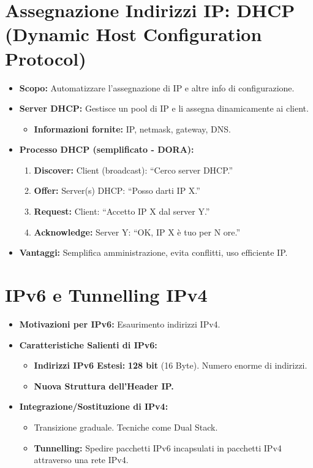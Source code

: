 \documentclass{article}
\begin{document}
\section{Assegnazione Indirizzi IP: DHCP (Dynamic Host Configuration Protocol)}
\begin{itemize}
    \item \textbf{Scopo:} Automatizzare l'assegnazione di IP e altre info di configurazione.
    \item \textbf{Server DHCP:} Gestisce un pool di IP e li assegna dinamicamente ai client.
    \begin{itemize}
        \item \textbf{Informazioni fornite:} IP, netmask, gateway, DNS.
    \end{itemize}
    \item \textbf{Processo DHCP (semplificato - DORA):}
    \begin{enumerate}
        \item \textbf{Discover:} Client (broadcast): ``Cerco server DHCP.''
        \item \textbf{Offer:} Server(s) DHCP: ``Posso darti IP X.''
        \item \textbf{Request:} Client: ``Accetto IP X dal server Y.''
        \item \textbf{Acknowledge:} Server Y: ``OK, IP X è tuo per N ore.''
    \end{enumerate}
    \item \textbf{Vantaggi:} Semplifica amministrazione, evita conflitti, uso efficiente IP.
\end{itemize}

\section{IPv6 e Tunnelling IPv4}
\begin{itemize}
    \item \textbf{Motivazioni per IPv6:} Esaurimento indirizzi IPv4.
    \item \textbf{Caratteristiche Salienti di IPv6:}
    \begin{itemize}
        \item \textbf{Indirizzi IPv6 Estesi:} \textbf{128 bit} (16 Byte). Numero enorme di indirizzi.
        \item \textbf{Nuova Struttura dell'Header IP.}
    \end{itemize}
    \item \textbf{Integrazione/Sostituzione di IPv4:}
    \begin{itemize}
        \item Transizione graduale. Tecniche come Dual Stack.
        \item \textbf{Tunnelling:} Spedire pacchetti IPv6 incapsulati in pacchetti IPv4 attraverso una rete IPv4.
    \end{itemize}
\end{itemize}
\end{document}
